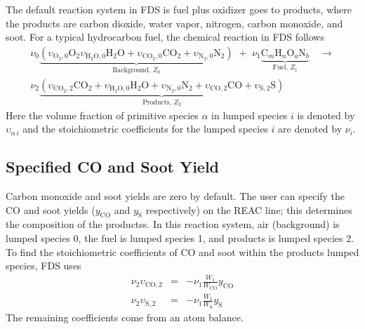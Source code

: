 The default reaction system in FDS is fuel plus oxidizer goes to products, where the products are carbon dioxide, water vapor, nitrogen, carbon monoxide, and soot. For a typical hydrocarbon fuel, the chemical reaction in FDS follows
\begin{multline}\label{eq:full_lump}
\nu_{0}\underbrace{(\upsilon_{\mathrm{O}_{2},0}\mathrm{O}_2 \upsilon_{\mathrm{H}_{2}\mathrm{O},0}\mathrm{H}_2\mathrm{O}+\upsilon_{\mathrm{CO}_{2},0}\mathrm{CO}_2+\upsilon_{\mathrm{N}_{2},0}\mathrm{N}_2)}_\text{Background,~$Z_0$} \,\,+ \,\, \nu_{1}\underbrace{\mbox{C}_m\mbox{H}_n\mbox{O}_a\mbox{N}_b}_\text{Fuel,~$Z_1$} \quad \longrightarrow \\
\nu_{2}\underbrace{(\upsilon_{\mathrm{CO}_{2},2}\mathrm{CO}_2+\upsilon_{\mathrm{H}_{2}\mathrm{O},0}\mathrm{H}_2\mathrm{O}+\upsilon_{\mathrm{N}_{2},0}\mathrm{N}_2+\upsilon_{\mathrm{CO},2}\mathrm{CO}+\upsilon_{\mathrm{S},2}\mathrm{S})}_\text{Products,~$Z_2$}
\end{multline}
Here the volume fraction of primitive species $\alpha$ in lumped species $i$ is denoted by $\upsilon_{\alpha\,i}$ and the stoichiometric coefficients for the lumped species $i$ are denoted by $\nu_{i}$.

\subsection{Specified CO and Soot Yield}

Carbon monoxide and soot yields are zero by default. The user can specify the CO and soot yields ($y_{\mathrm{CO}}$ and $y_{\mathrm{S}}$ respectively) on the {\ct REAC} line; this determines the composition of the productss. In this reaction system, air (background) is lumped species 0, the fuel is lumped species 1, and products is lumped species 2. To find the stoichiometric coefficients of CO and soot within the products lumped species, FDS uses
\begin{eqnarray}\label{eq:yields}
\nu_{2}\upsilon_{\mathrm{CO},2}&=&-\nu_{1}\frac{W_1}{W_{\mathrm{CO}}}y_{\mathrm{CO}} \\
\nu_{2}\upsilon_{\mathrm{S},2}&=&-\nu_{1}\frac{W_1}{W_{\mathrm{S}}}y_{\mathrm{S}}
\end{eqnarray}
The remaining coefficients come from an atom balance.

